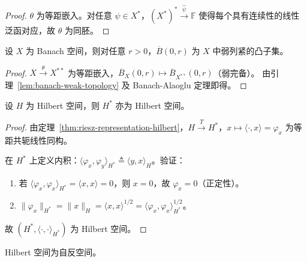 \documentclass[lang=cn,a4paper,newtx,section]{elegantbook}
\begin{document}
\begin{proof}
  $\theta$ 为等距嵌入。对任意 $\psi\in X^*$，$(X^*)^*\xrightarrow{\hat{\psi}}\mathbb{F}$ 使得每个具有连续性的线性泛函对应，故 $\theta$ 为同胚。
\end{proof}

\begin{theorem}\label{thm:banach-weak-compact}
  设 $X$ 为 Banach 空间，则对任意 $r>0$，$\overline{B}(0,r)$ 为 $X$ 中弱列紧的凸子集。
\end{theorem}

\begin{proof}
  $X\xrightarrow{\theta}X^{**}$ 为等距嵌入，$\overline{B}_X(0,r)\mapsto\overline{B}_{X^{**}}(0,r)$（弱完备）。
  由引理~\ref{lem:banach-weak-topology} 及 Banach-Alaoglu 定理即得。
\end{proof}

\begin{corollary}\label{cor:hilbert-dual-structure}
  设 $H$ 为 Hilbert 空间，则 $H^*$ 亦为 Hilbert 空间。
\end{corollary}

\begin{proof}
  由定理~\ref{thm:riesz-representation-hilbert}，$H\xrightarrow{T}H^*$，$x\mapsto\langle\cdot,x\rangle=\varphi_x$ 为等距共轭线性同构。

  在 $H^*$ 上定义内积：$\langle\varphi_x,\varphi_y\rangle_{H^*}\triangleq\langle y,x\rangle_H$。验证：
  \begin{enumerate}
    \item 若 $\langle\varphi_x,\varphi_x\rangle_{H^*}=\langle x,x\rangle=0$，则 $x=0$，故 $\varphi_x=0$（正定性）。
    \item $\|\varphi_x\|_{H^*}=\|x\|_H=\langle x,x\rangle^{1/2}=\langle\varphi_x,\varphi_x\rangle_{H^*}^{1/2}$。
  \end{enumerate}
  故 $(H^*,\langle\cdot,\cdot\rangle_{H^*})$ 为 Hilbert 空间。
\end{proof}

\begin{theorem}\label{thm:hilbert-reflexive}
  Hilbert 空间为自反空间。
\end{theorem}
\end{document}

